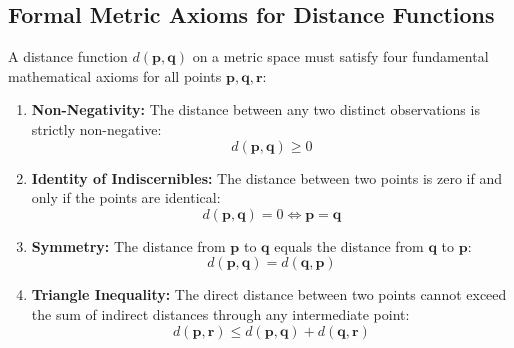 \subsection{Formal Metric Axioms for Distance Functions}
A distance function $d(\mathbf{p}, \mathbf{q})$ on a metric space must satisfy four fundamental mathematical axioms for all points $\mathbf{p}, \mathbf{q}, \mathbf{r}$:
\begin{enumerate}
    \item \textbf{Non-Negativity:} The distance between any two distinct observations is strictly non-negative:
    \begin{equation}
        d(\mathbf{p}, \mathbf{q}) \ge 0
    \end{equation}
    \item \textbf{Identity of Indiscernibles:} The distance between two points is zero if and only if the points are identical:
    \begin{equation}
        d(\mathbf{p}, \mathbf{q}) = 0 \iff \mathbf{p} = \mathbf{q}
    \end{equation}
    \item \textbf{Symmetry:} The distance from $\mathbf{p}$ to $\mathbf{q}$ equals the distance from $\mathbf{q}$ to $\mathbf{p}$:
    \begin{equation}
        d(\mathbf{p}, \mathbf{q}) = d(\mathbf{q}, \mathbf{p})
    \end{equation}
    \item \textbf{Triangle Inequality:} The direct distance between two points cannot exceed the sum of indirect distances through any intermediate point:
    \begin{equation}
        d(\mathbf{p}, \mathbf{r}) \le d(\mathbf{p}, \mathbf{q}) + d(\mathbf{q}, \mathbf{r})
    \end{equation}
\end{enumerate}

